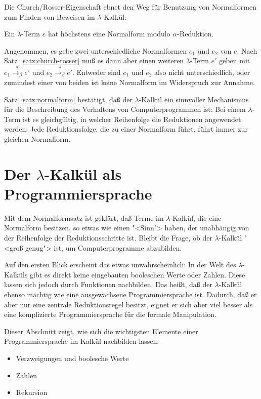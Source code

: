 Die Church/Rosser-Eigenschaft ebnet den Weg für Benutzung von
Normalformen zum Finden von Beweisen im $\lambda$-Kalkül:
%
\begin{satz}
  \label{satz:normalform}
  Ein $\lambda$-Term $e$ hat höchstens eine Normalform modulo
  $\alpha$-Reduktion.
\end{satz}
%
  \begin{beweis}
    Angenommen, es gebe zwei unterschiedliche Normalformen $e_1$ und
    $e_2$ von $e$.  Nach Satz~\ref{satz:church-rosser} muß es dann
    aber einen weiteren $\lambda$-Term $e'$ geben mit   $e_1\overset{\ast}{\rightarrow_\beta} e'$ und
  $e_2\overset{\ast}{\rightarrow_\beta} e'$.  Entweder sind $e_1$ und
    $e_2$ also nicht unterschiedlich, oder zumindest einer von
    beiden ist keine Normalform im Widerspruch zur Annahme.
  \end{beweis}
%
  Satz~\ref{satz:normalform} bestätigt, daß
  der $\lambda$-Kalkül ein sinnvoller Mechanismus für die Beschreibung
  des Verhaltens von Computerprogrammen ist: Bei einem $\lambda$-Term
  ist es gleichgültig, in welcher Reihenfolge die Reduktionen
  angewendet werden: Jede Reduktionsfolge, die zu einer Normalform
  führt, führt immer zur gleichen Normalform.

\section{Der $\lambda$-Kalkül als Programmiersprache}
\label{sec:lambdaprog}

Mit dem Normalformsatz ist geklärt, daß Terme im
$\lambda$-Kalkül, die eine Normalform besitzen, so etwas wie einen
"<Sinn"> haben, der unabhängig von der Reihenfolge der
Reduktionsschritte ist.  Bleibt die Frage, ob der $\lambda$-Kalkül
"<groß genug"> ist, um Computerprogramme abzubilden.

Auf den ersten Blick erscheint das etwas unwahrscheinlich: In der Welt
des $\lambda$-Kalküls gibt es direkt
keine eingebauten booleschen Werte oder Zahlen.
Diese lassen sich jedoch durch Funktionen nachbilden.  Das heißt,
daß der $\lambda$-Kalkül ebenso mächtig wie eine ausgewachsene
Programmiersprache ist.  Dadurch, daß er aber nur eine zentrale
Reduktionsregel besitzt, eignet er sich aber viel besser als eine
komplizierte Programmiersprache für die formale Manipulation.

Dieser Abschnitt zeigt, wie sich die wichtigsten Elemente einer
Programmiersprache im Kalkül nachbilden lassen:
%
\begin{itemize}
\item Verzweigungen und boolesche Werte
\item Zahlen
\item Rekursion
\end{itemize}
%
